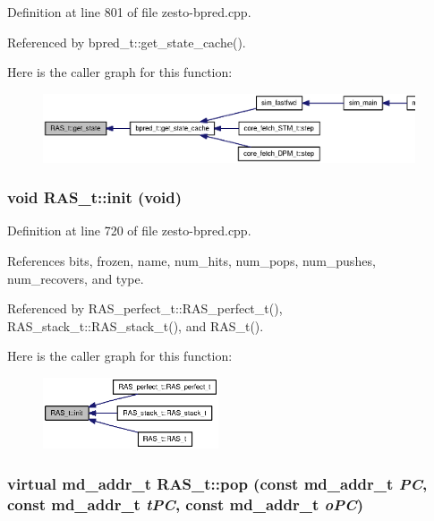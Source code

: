 Definition at line 801 of file zesto-bpred.cpp.

Referenced by bpred\_\-t::get\_\-state\_\-cache().

Here is the caller graph for this function:\nopagebreak
\begin{figure}[H]
\begin{center}
\leavevmode
\includegraphics[width=312pt]{classRAS__t_59bd61821697c014ac040ded2153cfcd_icgraph}
\end{center}
\end{figure}
\subsubsection[{init}]{\setlength{\rightskip}{0pt plus 5cm}void RAS\_\-t::init (void)\hspace{0.3cm}{\tt  [protected]}}\label{classRAS__t_8dd96780ed5d3250cae96ff2fe36e059}




Definition at line 720 of file zesto-bpred.cpp.

References bits, frozen, name, num\_\-hits, num\_\-pops, num\_\-pushes, num\_\-recovers, and type.

Referenced by RAS\_\-perfect\_\-t::RAS\_\-perfect\_\-t(), RAS\_\-stack\_\-t::RAS\_\-stack\_\-t(), and RAS\_\-t().

Here is the caller graph for this function:\nopagebreak
\begin{figure}[H]
\begin{center}
\leavevmode
\includegraphics[width=147pt]{classRAS__t_8dd96780ed5d3250cae96ff2fe36e059_icgraph}
\end{center}
\end{figure}
\subsubsection[{pop}]{\setlength{\rightskip}{0pt plus 5cm}virtual {\bf md\_\-addr\_\-t} RAS\_\-t::pop (const {\bf md\_\-addr\_\-t} {\em PC}, \/  const {\bf md\_\-addr\_\-t} {\em tPC}, \/  const {\bf md\_\-addr\_\-t} {\em oPC})\hspace{0.3cm}{\tt  [pure virtual]}}\label{classRAS__t_dae128acdfd775738dbe7e72590cff89}




